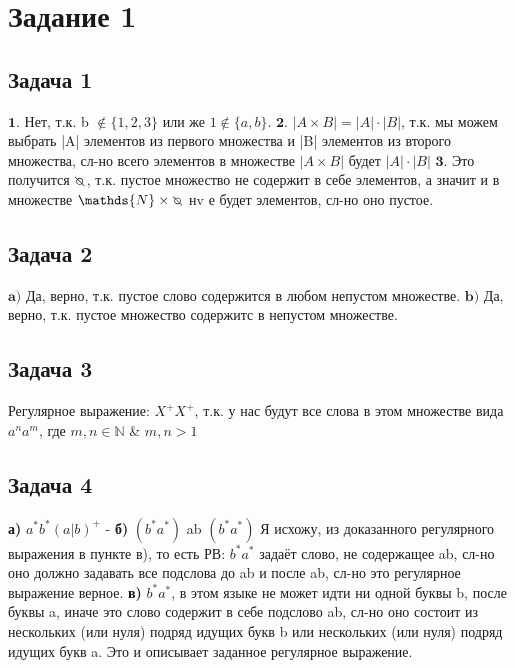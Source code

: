 \documentclass[a4paper,14pt]{article} %
\begin{document}

\section{Задание 1}
\subsection{Задача 1}

$\textbf{1.}$ Нет, т.к. b $\notin \{1, 2, 3\}$ или же $1 \notin \{a, b\}$.
\newline
$\textbf{2.}$ $|A \times B| = |A| \cdot |B|$, т.к. мы можем выбрать |A| элементов из первого множества 
и |B| элементов из второго множества, сл-но всего элементов в множестве $|A \times B|$ будет $|A| \cdot |B|$
\newline
$\textbf{3.}$ Это получится $\invdiameter$, т.к. пустое множество не содержит в себе элементов, а значит 
и в множестве $\mathds{N} \times \invdiameter$ нv е будет элементов, сл-но оно пустое.

\subsection{Задача 2}
$\textbf{a)}$ Да, верно, т.к. пустое слово содержится в любом непустом множестве.
\newline
$\textbf{b)}$ Да, верно, т.к. пустое множество содержитс в непустом множестве.

\subsection{Задача 3}
Регулярное выражение: $X^{+}X^{+}$, т.к. у нас будут все слова в этом множестве вида $a^{n}a^{m}$, где $m, n \in \mathds{N}$ \& $m, n>1$

\subsection{Задача 4}
\textbf{а)} $a^{*}b^{*}(a|b)^{+}$ - 
\newline
\textbf{б)} $(b^{*}a^{*})$ ab $(b^{*}a^{*})$ Я исхожу, из доказанного регулярного выражения в пункте в), то есть РВ: $b^{*}a^{*}$ задаёт слово, не содержащее ab, сл-но оно должно задавать все подслова до ab и после ab, сл-но это регулярное выражение верное.
\newline
\textbf{в)} $b^{*}a^{*}$, в этом языке не может идти ни одной буквы b, после буквы a, иначе это слово содержит в себе подслово ab, сл-но оно состоит из нескольких (или нуля) подряд идущих букв b или нескольких (или нуля) подряд идущих букв a.
Это и описывает заданное регулярное выражение.
\newline
\end{document}
